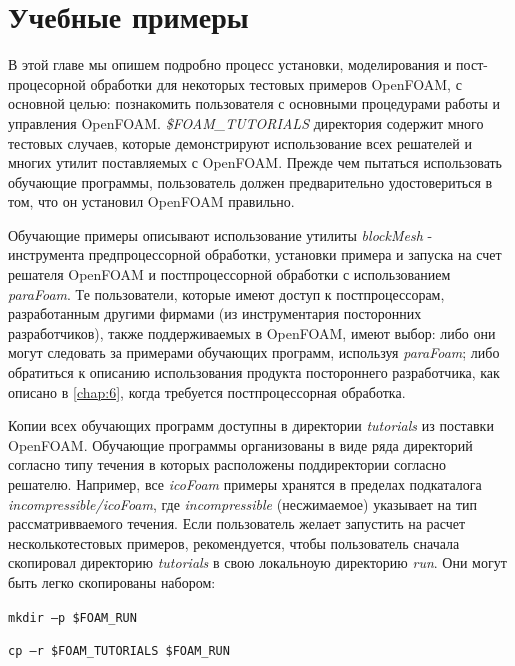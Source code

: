 \chapter{Учебные примеры}
\label{chap:2}
В этой главе мы опишем подробно процесс установки, моделирования и пост- процесорной обработки для некоторых тестовых
 примеров OpenFOAM, с основной целью: познакомить пользователя с основными процедурами работы и управления OpenFOAM.
 \textit{\$FOAM\_TUTORIALS} директория содержит много тестовых случаев, которые демонстрируют использование всех
 решателей и многих утилит поставляемых с OpenFOAM. Прежде чем пытаться использовать обучающие программы, пользователь
 должен предварительно удостовериться  в том, что он установил OpenFOAM правильно.

Обучающие примеры описывают использование утилиты \textsl{blockMesh} - инструмента предпроцессорной обработки, установки 
примера и запуска на счет решателя OpenFOAM и постпроцессорной обработки с использованием \textsl{paraFoam}.
 Те пользователи, которые имеют доступ к постпроцессорам, разработанным другими фирмами (из инструментария посторонних
 разработчиков), также поддерживаемых в OpenFOAM, имеют выбор: либо они могут следовать за примерами обучающих программ,
 используя \textsl{paraFoam}; либо обратиться к описанию использования продукта постороннего разработчика, как описано в
\autoref{chap:6}, когда требуется постпроцессорная обработка.

Копии всех обучающих программ доступны в директории \textit{tutorials} из поставки OpenFOAM.
Обучающие программы организованы
 в виде ряда директорий согласно типу течения в которых расположены поддиректории согласно решателю. Например,
 все \textsl{icoFoam} примеры хранятся в пределах подкаталога
 \textit{incompressible/icoFoam}, где \textit{incompressible}
(несжимаемое)  указывает на тип рассматривваемого течения. Если пользователь желает запустить на расчет несколькотестовых 
примеров,  рекомендуется, чтобы пользователь сначала скопировал директорию \textit{tutorials} в свою локальноую директорию
\textit{run}. Они могут быть легко скопированы набором:

\texttt{mkdir –p \$FOAM\_RUN}

\texttt{cp –r \$FOAM\_TUTORIALS \$FOAM\_RUN}

